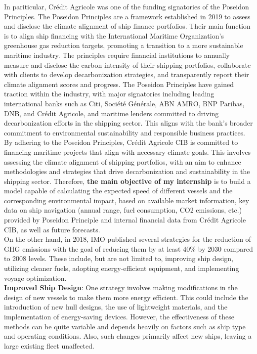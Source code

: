 \documentclass[a4paper,12pt]{article}
\begin{document}
In pariticular, Crédit Agricole was one of the funding signatories of the Poseidon Principles.
The Poseidon Principles are a framework established in 2019 to assess and disclose the climate alignment of ship finance portfolios.
Their main function is to align ship financing with the International Maritime Organization's greenhouse gas reduction targets, promoting a transition to a more sustainable maritime industry.
The principles require financial institutions to annually measure and disclose the carbon intensity of their shipping portfolios, collaborate with clients to develop decarbonization strategies, and transparently report their climate alignment scores and progress.
The Poseidon Principles have gained traction within the industry, with major signatories including leading international banks such as Citi, Société Générale, ABN AMRO, BNP Paribas, DNB, and Crédit Agricole, and maritime lenders committed to driving decarbonization efforts in the shipping sector.
This aligns with the bank's broader commitment to environmental sustainability and responsible business practices. By adhering to the Poseidon Principles, Crédit Agricole CIB is committed to financing maritime projects that align with necessary climate goals.
This involves assessing the climate alignment of shipping portfolios, with an aim to enhance methodologies and strategies that drive decarbonization and sustainability in the shipping sector.
Therefore, \textbf{the main objective of my internship} is to build a model capable of calculating the expected speed of different vessels and the corresponding environmental impact, based on available market information, key data on ship navigation (annual range, fuel consumption, CO2 emissions, etc.) provided by Poseidon Principle and internal financial data from Crédit Agricole CIB, as well as future forecasts.\\

On the other hand, in 2018, IMO published several strategies for the reduction of GHG emissions with the goal of reducing them by at least 40\% by 2030 compared to 2008 levels.
These include, but are not limited to, improving ship design, utilizing cleaner fuels, adopting energy-efficient equipment, and implementing voyage optimization.\\

\textbf{Improved Ship Design}: One strategy involves making modifications in the design of new vessels to make them more energy efficient.
This could include the introduction of new hull designs, the use of lightweight materials, and the implementation of energy-saving devices.
However, the effectiveness of these methods can be quite variable and depends heavily on factors such as ship type and operating conditions.
Also, such changes primarily affect new ships, leaving a large existing fleet unaffected.\\
\end{document}
